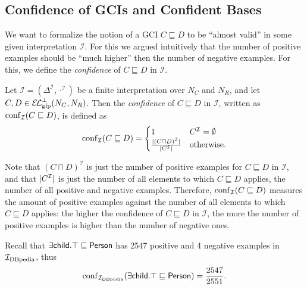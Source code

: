 \subsection{Confidence of GCIs and Confident Bases}
\label{sec:conf-gcis-conf}

We want to formalize the notion of a GCI $C \sqsubseteq D$ to be ``almost valid'' in some
given interpretation $\mathcal{I}$.  For this we argued intuitively that the number of
positive examples should be ``much higher'' then the number of negative examples.  For
this, we define the \emph{confidence} of $C \sqsubseteq D$ in $\mathcal{I}$.

\begin{Definition}
  \label{def:gci-confidence}
  Let $\mathcal{I} = (\Delta^{\mathcal{I}}, \cdot^{\mathcal{I}})$ be a finite
  interpretation over $N_C$ and $N_R$, and let $C, D \in {\ensuremath{{\mathcal{E}\kern-.3ex\mathcal{L}}_\text{gfp}^\bot}}(N_C, N_R)$.  Then the
  \emph{confidence} of $C \sqsubseteq D$ in $\mathcal{I}$, written as
  $\operatorname{conf}_{\mathcal{I}}(C \sqsubseteq D)$, is defined as
  \begin{equation*}
    \operatorname{conf}_{\mathcal{I}}( C \sqsubseteq D ) =
    \begin{cases}
      1 & C^{\mathcal{I}} = \emptyset \\
      \frac{\lvert (C \sqcap D)^{\mathcal{I}} \rvert}{\lvert C^{\mathcal{I}} \rvert} & \text{otherwise.}
    \end{cases}
  \end{equation*}
\end{Definition}
Note that $(C \sqcap D)^{\mathcal{I}}$ is just the number of positive examples for $C
\sqsubseteq D$ in $\mathcal{I}$, and that $\lvert C^{\mathcal{I}}\rvert$ is just the number of
all elements to which $C \sqsubseteq D$ applies, \ie the number of all positive and
negative examples.  Therefore, $\operatorname{conf}_{\mathcal{I}}(C \sqsubseteq D)$ measures the amount
of positive examples against the number of all elements to which $C \sqsubseteq D$
applies: the higher the confidence of $C \sqsubseteq D$ in $\mathcal{I}$, the more the
number of positive examples is higher than the number of negative ones.

\begin{Example}
  \label{expl:Idbpedia-confidence}
  Recall that $\sf \exists child. \top \sqsubseteq Person$ has 2547 positive and 4
  negative examples in ${\mathcal{I}_{\text{DBpedia}}}$, thus
  \begin{equation*}
    \operatorname{conf}_{\mathcal{I}_{\text{DBpedia}}}( {\sf \exists child. \top \sqsubseteq Person } ) = \frac{ 2547 }{ 2551 }.
  \end{equation*}
\end{Example}

